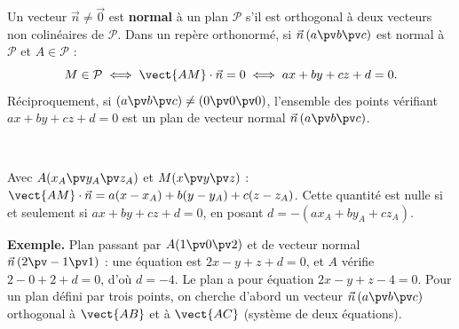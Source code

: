 \noindent
\begin{minipage}[c]{0.58\linewidth}
\begin{theoreme}
\raggedright
Un vecteur $\vec n\neq\vec0$ est \textbf{normal} à un plan $\mathcal{P}$ s'il est orthogonal à deux vecteurs non colinéaires de
$\mathcal{P}$. Dans un repère orthonormé, si $\vec n\,(a\pv b\pv c)$ est normal à $\mathcal{P}$ et $A\in\mathcal{P}$ :
\[M\in\mathcal{P}\iff\vect{AM}\cdot\vec n=0\iff ax+by+cz+d=0.\]
Réciproquement, si $(a\pv b\pv c)\neq(0\pv0\pv0)$, l'ensemble des points vérifiant $ax+by+cz+d=0$ est un plan de vecteur normal
$\vec n\,(a\pv b\pv c)$.
\end{theoreme}
\end{minipage}\hfill
\begin{minipage}[c]{0.38\linewidth}
\centering
{}\\[0.5mm]
\end{minipage}

\begin{demonstration}
Avec $A(x_A\pv y_A\pv z_A)$ et $M(x\pv y\pv z)$ : $\vect{AM}\cdot\vec n=a(x-x_A)+b(y-y_A)+c(z-z_A)$. Cette quantité est nulle si et
seulement si $ax+by+cz+d=0$, en posant $d=-(ax_A+by_A+cz_A)$.
\end{demonstration}

\begin{savoirfaire}
\textbf{Exemple.} Plan passant par $A(1\pv0\pv2)$ et de vecteur normal $\vec n\,(2\pv-1\pv1)$ : une équation est
$2x-y+z+d=0$, et $A$ vérifie $2-0+2+d=0$, d'où $d=-4$. Le plan a pour équation $\boxed{2x-y+z-4=0}$. Pour un plan défini par trois
points, on cherche d'abord un vecteur $\vec n\,(a\pv b\pv c)$ orthogonal à $\vect{AB}$ et à $\vect{AC}$ (système de deux équations).
\end{savoirfaire}


